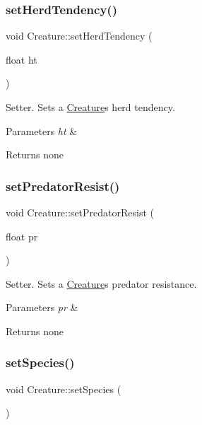 \subsubsection{\texorpdfstring{set\+Herd\+Tendency()}{setHerdTendency()}}
{\footnotesize\ttfamily void Creature\+::set\+Herd\+Tendency (\begin{DoxyParamCaption}\item[{float}]{ht }\end{DoxyParamCaption})}

Setter. Sets a \hyperlink{class_creature}{Creature}\textquotesingle{}s herd tendency. 
\begin{DoxyParams}{Parameters}
{\em ht} & \\
\hline
\end{DoxyParams}
\begin{DoxyReturn}{Returns}
none 
\end{DoxyReturn}
\mbox{\label{class_creature_a1e8c730feef5947ead25549f7b43c36c}} 
\subsubsection{\texorpdfstring{set\+Predator\+Resist()}{setPredatorResist()}}
{\footnotesize\ttfamily void Creature\+::set\+Predator\+Resist (\begin{DoxyParamCaption}\item[{float}]{pr }\end{DoxyParamCaption})}

Setter. Sets a \hyperlink{class_creature}{Creature}\textquotesingle{}s predator resistance. 
\begin{DoxyParams}{Parameters}
{\em pr} & \\
\hline
\end{DoxyParams}
\begin{DoxyReturn}{Returns}
none 
\end{DoxyReturn}
\mbox{\label{class_creature_ad55d859cd054fb78c7ec368a8f93fdab}} 
\subsubsection{\texorpdfstring{set\+Species()}{setSpecies()}}
{\footnotesize\ttfamily void Creature\+::set\+Species (\begin{DoxyParamCaption}{ }\end{DoxyParamCaption})}

